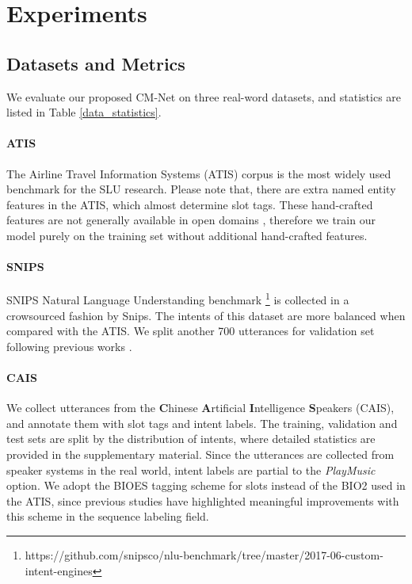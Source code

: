 \documentclass[11pt,a4paper]{article}
\begin{document}
\section{Experiments}
\label{experiments}

\subsection{Datasets and Metrics}
\label{datasets}
We evaluate our proposed CM-Net on three real-word datasets, and statistics are listed in Table \ref{data_statistics}.

\paragraph{ATIS} The Airline Travel Information Systems (ATIS) corpus \cite{atis_1990} is the most widely used benchmark for the SLU research. 
Please note that, there are extra named entity features in the ATIS, which almost determine slot tags. These hand-crafted features are not generally available in open domains \cite{a_joint_2016,a_joint_2014}, therefore we train our model purely on the training set without additional hand-crafted features.

\paragraph{SNIPS} SNIPS Natural Language Understanding benchmark \footnote{https://github.com/snipsco/nlu-benchmark/tree/master/2017-06-custom-intent-engines} \cite{snips_2018} is collected in a crowsourced fashion by Snips. The intents of this dataset are more balanced when compared with the ATIS. We split another 700 utterances for validation set following previous works \cite{slot_gated_2018, capsule_2018}.

\paragraph{CAIS} 
We collect utterances from the $\mathbf{C}$hinese $\mathbf{A}$rtificial $\mathbf{I}$ntelligence $\mathbf{S}$peakers (CAIS), and annotate them with slot tags and intent labels.
The training, validation and test sets are split by the distribution of intents, where detailed statistics are provided in the supplementary material. Since the utterances are collected from speaker systems in the real world, intent labels are partial to the \emph{PlayMusic} option.
We adopt the BIOES tagging scheme for slots instead of the BIO2 used in the ATIS, since previous studies have highlighted meaningful improvements with this scheme \cite{BIES} in the sequence labeling field. 
\end{document}
